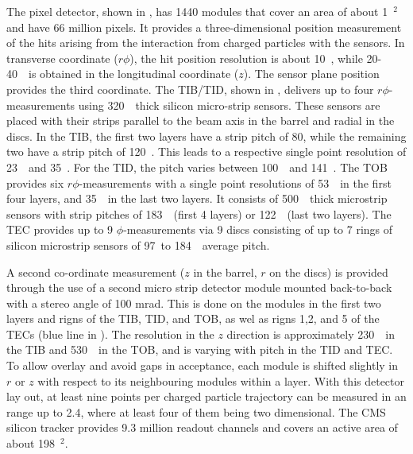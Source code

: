  The pixel detector, shown in , has 1440 modules that cover an area of about 1~\meter$^2$ and have 66 million pixels. It provides a three-dimensional position measurement of the hits arising from the interaction from charged particles with the sensors. In transverse coordinate ($r\phi$), the hit position resolution is about 10~\micro \meter, while 20-40~\micro \meter\ is obtained in the longitudinal coordinate ($z$). The sensor plane position provides the third coordinate. 
 The TIB/TID, shown in , delivers up to four $r\phi$-measurements using  320~\micro\meter\ thick silicon micro-strip sensors. These sensors are placed with their strips parallel to the beam axis in the barrel and radial in the discs. In the TIB, the first two layers have a strip pitch of 80\micro \meter, while the remaining two have a strip pitch of 120~\micro\meter. This leads to a respective single point resolution of 23~\micro\meter\ and 35~\micro\meter. For the TID, the pitch varies between 100~\micro\meter\ and 141~\micro\meter. 
 The TOB provides six $r\phi$-measurements with a single point resolutions of 53~\micro\meter\ in the first four layers, and 35~\micro \meter\ in the last two layers. It consists of 500~\micro\meter\ thick microstrip sensors with strip pitches of 183~\micro\meter\ (first 4 layers) or 122~\micro\meter\ (last two layers). The TEC provides up to 9 $\phi$-measurements via 9 discs consisting of up to 7 rings of silicon microstrip sensors of 97~\micro\meter to 184~\micro\meter\ average pitch.
 
 A second co-ordinate measurement ($z$ in the barrel, $r$ on the discs) is provided through the use of a second micro strip detector module mounted back-to-back with a stereo angle of 100 mrad. This is done on the modules in the first two layers and rigns of the TIB, TID, and TOB, as wel as rigns 1,2, and 5 of the TECs (blue line in ). The resolution in the  $z$ direction is approximately 230~\micro \meter\ in the TIB and 530~\micro \meter\ in the TOB, and is varying with pitch in the TID and TEC.  To allow overlay and avoid gaps in acceptance, each module is shifted slightly in $r$ or $z$ with respect to its neighbouring modules within a layer.  With this detector lay out, at least nine points per charged particle trajectory can be measured in an \abspsrap range up to 2.4, where at least four of them being two dimensional.
 The CMS silicon tracker provides 9.3 million readout channels and covers an active area of about 198~\meter$^2$.  
  
  
   
